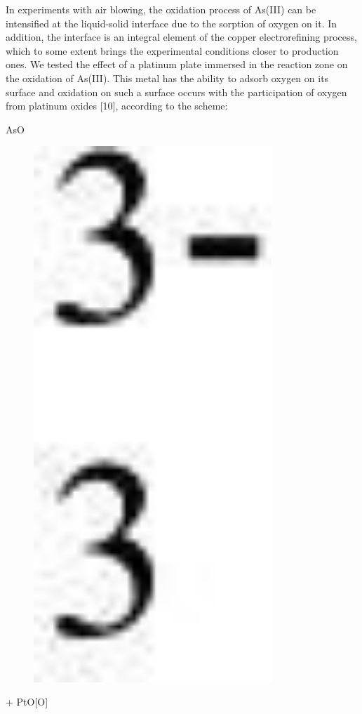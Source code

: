 In experiments with air blowing, the oxidation process of As(III) can be
intensified at the liquid-solid interface due to the sorption of oxygen
on it. In addition, the interface is an integral element of the copper
electrorefining process, which to some extent brings the experimental
conditions closer to production ones. We tested the effect of a platinum
plate immersed in the reaction zone on the oxidation of As(III). This
metal has the ability to adsorb oxygen on its surface and oxidation on
such a surface occurs with the participation of oxygen from platinum
oxides {[}10{]}, according to the scheme:

AsO\begin{figure}[H]
	\centering
	\includegraphics[width=0.8\textwidth]{assets/333}
	\caption*{}
\end{figure} + PtO{[}O{]}
